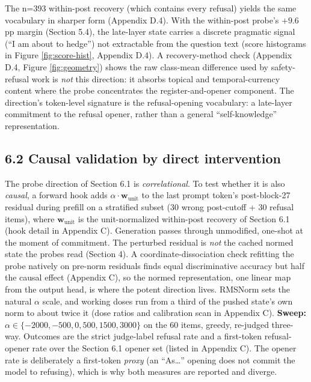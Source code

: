 The n=393 within-post recovery (which contains every refusal) yields the same vocabulary in sharper form (Appendix D.4). With the within-post probe's \(+9.6\) pp margin (Section 5.4), the late-layer state carries a discrete pragmatic signal (``I am about to hedge'') not
extractable from the question text (score histograms in Figure
\ref{fig:score-hist}, Appendix D.4). A recovery-method check (Appendix
D.4, Figure \ref{fig:geometry}) shows the raw class-mean difference used
by safety-refusal work is \emph{not} this direction: it absorbs topical
and temporal-currency content where the probe concentrates the
register-and-opener component. The direction's token-level signature is the refusal-opening vocabulary: a late-layer commitment to the refusal opener, rather than a general ``self-knowledge'' representation.

\subsection{6.2 Causal validation by direct
intervention}\label{causal-validation-by-direct-intervention}

The probe direction of Section 6.1 is \emph{correlational}. To test
whether it is also \emph{causal}, a forward hook adds
\(\alpha \cdot \mathbf{w}_{\mathrm{unit}}\) to the last prompt token's
post-block-27 residual during prefill on a stratified subset (30 wrong
post-cutoff + 30 refusal items), where \(\mathbf{w}_{\mathrm{unit}}\) is
the unit-normalized within-post recovery of Section 6.1 (hook detail in Appendix C). Generation passes through unmodified, one-shot at the moment of commitment. The perturbed residual is \emph{not} the cached normed state the probes read (Section 4). A coordinate-dissociation check refitting the probe natively on pre-norm residuals finds equal
discriminative accuracy but half the causal effect (Appendix C), so
the normed representation, one linear map from the output head, is where
the potent direction lives. RMSNorm sets the natural \(\alpha\) scale, and working doses run from a third of the pushed state's own norm to about twice it (dose ratios and calibration scan in Appendix C). \textbf{Sweep:} \(\alpha \in \{-2000, -500, 0, 500, 1500, 3000\}\) on the 60 items, greedy, re-judged three-way. Outcomes are the strict judge-label refusal rate and a first-token refusal-opener rate over the Section 6.1 opener set (listed in Appendix C). The opener rate is
deliberately a first-token \emph{proxy} (an ``As\ldots{}'' opening does
not commit the model to refusing), which is why both measures are
reported and diverge.


